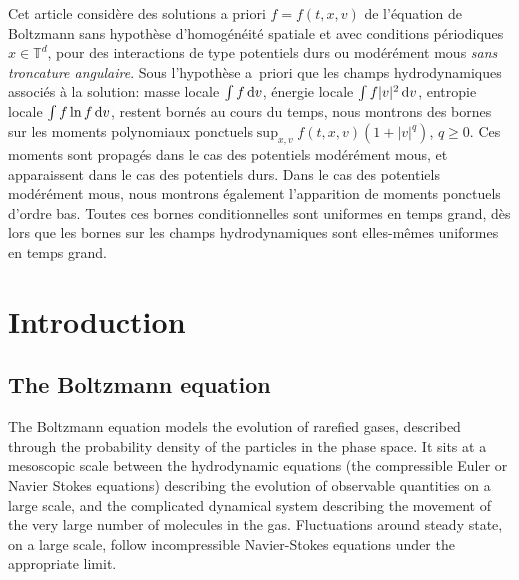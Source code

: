 \documentclass[JEP,XML,SOM,Unicode,NoFloatCountersInSection]{cedram}
\theoremstyle{plain}
\theoremstyle{definition}
\numberwithin{equation}{section}
\begin{document}



\begin{altabstract}
Cet article considère des solutions a priori $f = f (t, x, v)$ de l'équation de Boltzmann sans hypo\-thèse d'homogénéité spatiale et avec conditions périodiques $x\!\in\!\mathbb T^d$, pour des interactions de type potentiels durs ou modérément mous \emph{sans troncature angulaire}. Sous l'hypothèse a~priori que les champs hydrodynamiques associés à la solution: masse locale $\int f \, {\rm d}v$, énergie locale $\int f |v|^2 \, {\rm d}v$, entropie locale $\int f \ln f \, {\rm d}v$, restent bornés au cours du temps, nous montrons des bornes sur les \og moments polynomiaux ponctuels\fg $\sup_{x,v} f(t,x,v) (1+|v|^q)$, $q\geq0$. Ces moments sont propagés dans le cas des potentiels modérément mous, et apparaissent dans le cas des potentiels durs. Dans le cas des potentiels modérément mous, nous montrons également l'apparition de moments ponctuels d'ordre bas. Toutes ces bornes conditionnelles sont uniformes en temps grand, dès lors que les bornes sur les champs hydrodynamiques sont elles-mêmes uniformes en temps grand.
\end{altabstract}
\maketitle
\vspace*{-1.5\baselineskip}\enlargethispage{.5\baselineskip}%
\tableofcontents
\mainmatter

\section{Introduction}

\subsection{The Boltzmann equation}

The Boltzmann equation models the evolution of rarefied gases,
described through the probability density of the particles in the
phase space. It sits at a mesoscopic scale between the hydrodynamic
equations (\eg the compressible Euler or Navier Stokes equations)
describing the evolution of observable quantities on a large scale,
and the complicated dynamical system describing the movement of the
very large number of molecules in the gas. Fluctuations around steady
state, on a large scale, follow incompressible Navier-Stokes equations
under the appropriate limit.
\end{document}

